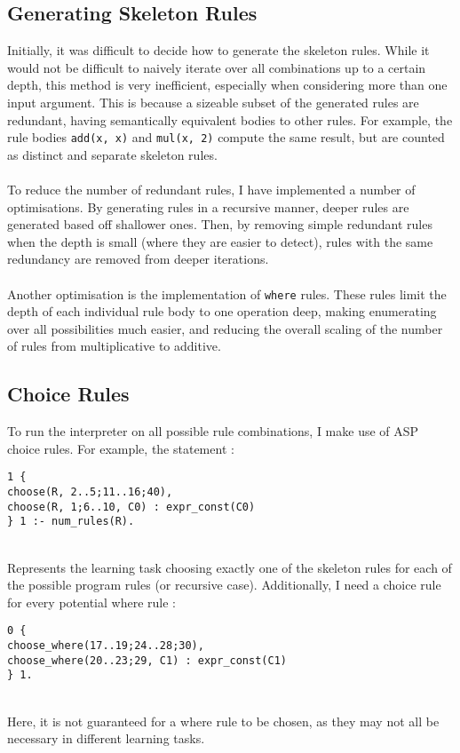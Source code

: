 \subsection{Generating Skeleton Rules}
Initially, it was difficult to decide how to generate the skeleton rules. While it would not be difficult to naively iterate over all combinations up to a certain depth, this method is very inefficient, especially when considering more than one input argument. This is because a sizeable subset of the generated rules are redundant, having semantically equivalent bodies to other rules. For example, the rule bodies \lstinline{add(x, x)} and \lstinline{mul(x, 2)} compute the same result, but are counted as distinct and separate skeleton rules.\\ \\
To reduce the number of redundant rules, I have implemented a number of optimisations. By generating rules in a recursive manner, deeper rules are generated based off shallower ones. Then, by removing simple redundant rules when the depth is small (where they are easier to detect), rules with the same redundancy are removed from deeper iterations. \\ \\
Another optimisation is the implementation of \lstinline{where} rules. These rules limit the depth of each individual rule body to one operation deep, making enumerating over all possibilities much easier, and reducing the overall scaling of the number of rules from multiplicative to additive. %

\subsection{Choice Rules}
To run the interpreter on all possible rule combinations, I make use of ASP choice rules. For example, the statement :

\begin{lstlisting}
1 {
choose(R, 2..5;11..16;40),
choose(R, 1;6..10, C0) : expr_const(C0)
} 1 :- num_rules(R).
\end{lstlisting}
\mbox{} \\
Represents the learning task choosing exactly one of the skeleton rules for each of the possible program rules (or recursive case). Additionally, I need a choice rule for every potential where rule : 

\begin{lstlisting}
0 {
choose_where(17..19;24..28;30),
choose_where(20..23;29, C1) : expr_const(C1)
} 1.
\end{lstlisting}
\mbox{} \\
Here, it is not guaranteed for a where rule to be chosen, as they may not all be necessary in different learning tasks. 

